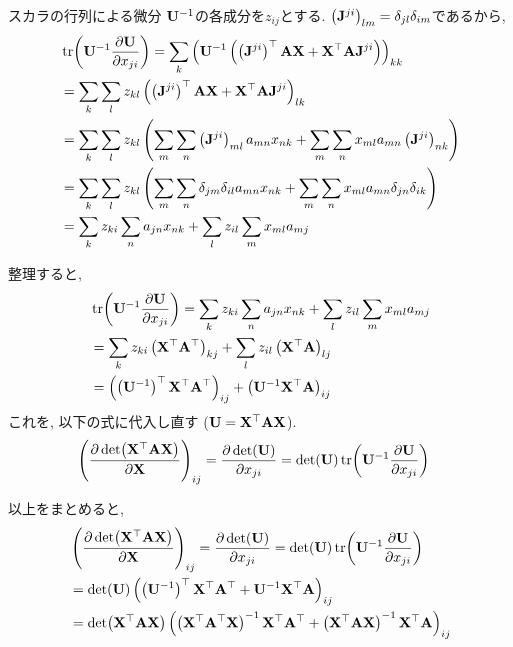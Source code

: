 \documentclass[dvipdfmx,notheorems,t]{beamer}
\begin{document}
\begin{frame}{スカラの行列による微分}
$\vb{U}^{-1}$の各成分を$z_{ij}$とする.
$\left( \vb{J}^{ji} \right)_{lm} = \delta_{jl} \delta_{im}$であるから,
\begin{align*}
  & \tr(\vb{U}^{-1} \pdv{\vb{U}}{x_{ji}})
    = \sum_k \left( \vb{U}^{-1} \left(
      \left( \vb{J}^{ji} \right)^\top \vb{A} \vb{X}
      + \vb{X}^\top \vb{A} \vb{J}^{ji} \right) \right)_{kk} \\
    &= \sum_k \sum_l z_{kl} \left(
      \left( \vb{J}^{ji} \right)^\top \vb{A} \vb{X}
      + \vb{X}^\top \vb{A} \vb{J}^{ji} \right)_{lk} \\
    &= \sum_k \sum_l z_{kl} \left(
      \sum_m \sum_n \left( \vb{J}^{ji} \right)_{ml} a_{mn} x_{nk}
      + \sum_m \sum_n x_{ml} a_{mn} \left( \vb{J}^{ji} \right)_{nk} \right) \\
    &= \sum_k \sum_l z_{kl} \left(
      \sum_m \sum_n \delta_{jm} \delta_{il} a_{mn} x_{nk}
      + \sum_m \sum_n x_{ml} a_{mn} \delta_{jn} \delta_{ik} \right) \\
    &= \sum_k z_{ki} \sum_n a_{jn} x_{nk} + \sum_l z_{il} \sum_m x_{ml} a_{mj}
\end{align*}
\newpage

整理すると,
\begin{align*}
  & \tr(\vb{U}^{-1} \pdv{\vb{U}}{x_{ji}})
    = \sum_k z_{ki} \sum_n a_{jn} x_{nk} + \sum_l z_{il} \sum_m x_{ml} a_{mj} \\
  &= \sum_k z_{ki} \left( \vb{X}^\top \vb{A}^\top \right)_{kj}
    + \sum_l z_{il} \left( \vb{X}^\top \vb{A} \right)_{lj} \\
  &= \left( \left( \vb{U}^{-1} \right)^\top \vb{X}^\top \vb{A}^\top \right)_{ij}
    + \left( \vb{U}^{-1} \vb{X}^\top \vb{A} \right)_{ij}
\end{align*}
これを, 以下の式に代入し直す ($\vb{U} = \vb{X}^\top \vb{A} \vb{X}$).
\begin{align*}
  & \left( \pdv{\det(\vb{X}^\top \vb{A} \vb{X})}{\vb{X}} \right)_{ij}
    = \pdv{\det(\vb{U})}{x_{ji}}
    = \det(\vb{U}) \tr(\vb{U}^{-1} \pdv{\vb{U}}{x_{ji}})
\end{align*}
\newpage

以上をまとめると,
\begin{align*}
  & \left( \pdv{\det(\vb{X}^\top \vb{A} \vb{X})}{\vb{X}} \right)_{ij}
    = \pdv{\det(\vb{U})}{x_{ji}}
    = \det(\vb{U}) \tr(\vb{U}^{-1} \pdv{\vb{U}}{x_{ji}}) \\
    &= \det(\vb{U}) \left( \left( \vb{U}^{-1} \right)^\top \vb{X}^\top \vb{A}^\top
      + \vb{U}^{-1} \vb{X}^\top \vb{A} \right)_{ij} \\
    &= \det(\vb{X}^\top \vb{A} \vb{X}) \left(
      \left( \vb{X}^\top \vb{A}^\top \vb{X} \right)^{-1} \vb{X}^\top \vb{A}^\top
      + \left( \vb{X}^\top \vb{A} \vb{X} \right)^{-1} \vb{X}^\top \vb{A} \right)_{ij}
\end{align*}


\end{frame}
\end{document}
